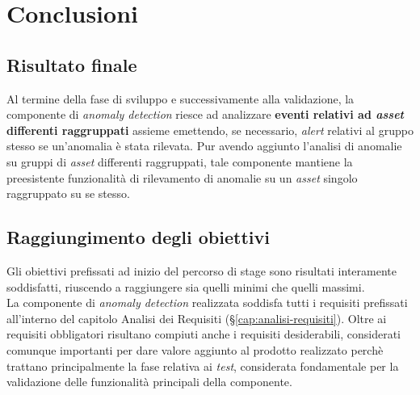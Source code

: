 
\chapter{Conclusioni}
\label{cap:conclusioni}


\section{Risultato finale}
Al termine della fase di sviluppo e successivamente alla validazione, la componente di \textit{anomaly detection} riesce ad analizzare \textbf{eventi relativi ad \textit{asset} differenti raggruppati} assieme emettendo, se necessario, \textit{alert} relativi al gruppo stesso se un'anomalia è stata rilevata. Pur avendo aggiunto l'analisi di anomalie su gruppi di \textit{asset} differenti raggruppati, tale componente mantiene la preesistente funzionalità di rilevamento di anomalie su un \textit{asset} singolo raggruppato su se stesso.

\section{Raggiungimento degli obiettivi}
Gli obiettivi prefissati ad inizio del percorso di stage sono risultati interamente soddisfatti, riuscendo a raggiungere sia quelli minimi che quelli massimi.\\
La componente di \textit{anomaly detection} realizzata soddisfa tutti i requisiti prefissati all'interno del capitolo Analisi dei Requisiti (\S\ref{cap:analisi-requisiti}). Oltre ai requisiti obbligatori risultano compiuti anche i requisiti desiderabili, considerati comunque importanti per dare valore aggiunto al prodotto realizzato perchè trattano principalmente la fase relativa ai \textit{test}, considerata fondamentale per la validazione delle funzionalità principali della componente.

